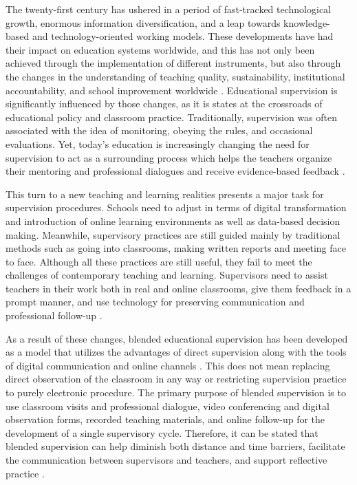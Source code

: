 \documentclass[10pt]{NSP1}
\begin{document}
The twenty-first century has ushered in a period of fast-tracked technological growth, enormous information diversification, and a leap towards knowledge-based and technology-oriented working models. These developments have had their impact on education systems worldwide, and this has not only been achieved through the implementation of different instruments, but also through the changes in the understanding of teaching quality, sustainability, institutional accountability, and school improvement worldwide \cite{ref1}. Educational supervision is significantly influenced by those changes, as it is states at the crossroads of educational policy and classroom practice. Traditionally, supervision was often associated with the idea of monitoring, obeying the rules, and occasional evaluations. Yet, today's education is increasingly changing the need for supervision to act as a surrounding process which helps the teachers organize their mentoring and professional dialogues and receive evidence-based feedback \cite{ref2,ref3,ref4}.

This turn to a new teaching and learning realities presents a major task for supervision procedures. Schools need to adjust in terms of digital transformation and introduction of online learning environments as well as data-based decision making. Meanwhile, supervisory practices are still guided mainly by traditional methods such as going into classrooms, making written reports and meeting face to face. Although all these practices are still useful, they fail to meet the challenges of contemporary teaching and learning. Supervisors need to assist teachers in their work both in real and online classrooms, give them feedback in a prompt manner, and use technology for preserving communication and professional follow-up \cite{ref5}.

As a result of these changes, blended educational supervision has been developed as a model that utilizes the advantages of direct supervision along with the tools of digital communication and online channels \cite{ref6}. This does not mean replacing direct observation of the classroom in any way or restricting supervision practice to purely electronic procedure. The primary purpose of blended supervision is to use classroom visits and professional dialogue, video conferencing and digital observation forms, recorded teaching materials, and online follow-up for the development of a single supervisory cycle. Therefore, it can be stated that blended supervision can help diminish both distance and time barriers, facilitate the communication between supervisors and teachers, and support reflective practice \cite{ref7,ref8,ref9}.
\end{document}
